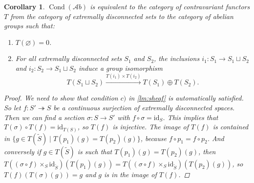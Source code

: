 \documentclass[11pt,A4]{article}
\theoremstyle{plain}
\newtheorem{cor}[thm]{Corollary}
\theoremstyle{definition}
\theoremstyle{remark}
\newcommand{\1}{\mathbbm{1}}
\newcommand{\Ab}{\mathscr{A}b}
\DeclareMathOperator{\Cond}{Cond}
\newcommand{\op}{\oplus}
\newcommand{\fp}[1]{\times_{#1}}
\newcommand{\id}{\mathrm{id}}
\begin{document}
\begin{cor}\label{cor:sheaf}
    $\Cond(\Ab)$ is equivalent to the category of contravariant functors $T$ from the category of extremally disconnected sets to the category of abelian groups such that:
    \begin{enumerate}[label=\alph*)]
	\item $T(\varnothing)=0$.
	\item For all extremally disconnected sets $S_{1}$ and $S_{2}$, the inclusions $i_{1}\colon S_{1}\to S_{1}\sqcup S_{2}$ and $i_{2}\colon S_{2}\to S_{1}\sqcup S_{2}$ induce a group isomorphism
	    \[ T(S_{1}\sqcup S_{2})\xrightarrow{T(i_{1})\times T(i_{2})} T(S_{1})\op T(S_{2}).\]
    \end{enumerate}
    \begin{proof}
	We need to show that condition $c)$ in \cref{lm:sheaf} is automatically satisfied.
	So let $f\colon S'\twoheadrightarrow S$ be a continuous surjection of extremally disconnected spaces.
	Then we can find a section $\sigma\colon S\to S'$ with $f\circ \sigma =\id_{S}$.
	This implies that $T(\sigma)\circ T(f)=\id_{T(S)}$, so $T(f)$ is injective.
	The image of $T(f)$ is contained in $\{ g\in T(\tilde{S})\mid T(p_{1})(g)=T(p_{2})(g)\}$, because $f\circ p_{1}=f\circ p_{2}$.
	And conversely if $g\in T(\tilde{S})$ is such that $T(p_{1})(g)=T(p_{2})(g)$, then $T((\sigma \circ f)\fp{S}\id_{\tilde{S}})(T(p_{1})(g))=T((\sigma \circ f)\fp{S}\id_{\tilde{S}})(T(p_{2})(g))$, so $T(f)(T(\sigma)(g))=g$ and $g$ is in the image of $T(f)$.
    \end{proof}
\end{cor}
\end{document}
